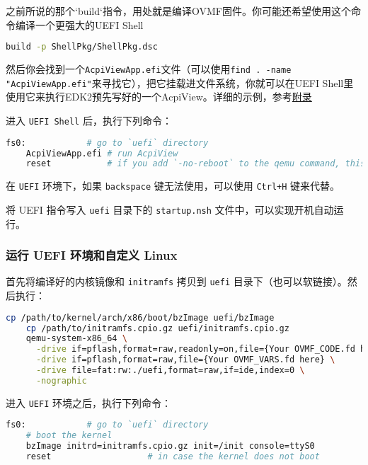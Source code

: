 之前所说的那个`build`指令，用处就是编译OVMF固件。你可能还希望使用这个命令编译一个更强大的UEFI Shell
\begin{lstlisting}[language=bash]
build -p ShellPkg/ShellPkg.dsc
\end{lstlisting}

然后你会找到一个\texttt{AcpiViewApp.efi}文件（可以使用\texttt{find . -name "AcpiViewApp.efi"}来寻找它），把它挂载进文件系统，你就可以在UEFI Shell里使用它来执行EDK2预先写好的一个AcpiView。详细的示例，参考\hyperref[appendix:launchuefi]{附录}

进入 \texttt{UEFI Shell} 后，执行下列命令：

\begin{lstlisting}[language=bash]
    fs0:            # go to `uefi` directory
    AcpiViewApp.efi # run AcpiView
    reset           # if you add `-no-reboot` to the qemu command, this will exit the UEFI Shell
\end{lstlisting}


\begin{remark}
    在 \texttt{UEFI} 环境下，如果 \texttt{backspace} 键无法使用，可以使用 \texttt{Ctrl+H} 键来代替。
\end{remark}

\begin{remark}
    将 UEFI 指令写入 \texttt{uefi} 目录下的 \texttt{startup.nsh} 文件中，可以实现开机自动运行。
\end{remark}


\subsubsection{运行 UEFI 环境和自定义 Linux}

首先将编译好的内核镜像和 \texttt{initramfs} 拷贝到 \texttt{uefi} 目录下（也可以软链接）。然后执行：

\begin{lstlisting}[language=bash]
    cp /path/to/kernel/arch/x86/boot/bzImage uefi/bzImage
    cp /path/to/initramfs.cpio.gz uefi/initramfs.cpio.gz
    qemu-system-x86_64 \
      -drive if=pflash,format=raw,readonly=on,file={Your OVMF_CODE.fd here} \
      -drive if=pflash,format=raw,file={Your OVMF_VARS.fd here} \
      -drive file=fat:rw:./uefi,format=raw,if=ide,index=0 \
      -nographic
\end{lstlisting}

进入 \texttt{UEFI} 环境之后，执行下列命令：

\begin{lstlisting}[language=bash]
    fs0:            # go to `uefi` directory
    # boot the kernel
    bzImage initrd=initramfs.cpio.gz init=/init console=ttyS0
    reset                   # in case the kernel does not boot
\end{lstlisting}

